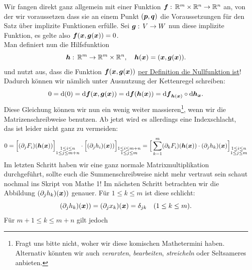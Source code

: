 Wir fangen direkt ganz allgemein mit einer Funktion ${{\text{\boldmath${f}$}}}:\,\mathbb{R}^m\times\mathbb{R}^n\rightarrow\mathbb{R}^n$ an, von der wir voraussetzen dass sie an einem Punkt $({{\text{\boldmath${p}$}}},{{\text{\boldmath${q}$}}})$ die Voraussetzungen für den Satz über implizite Funktionen erfülle. Sei ${{\text{\boldmath${g}$}}}:\,V\rightarrow W$ nun diese implizite Funktion, es gelte also ${{\text{\boldmath${f}$}}}({{\text{\boldmath${x}$}}},{{\text{\boldmath${g}$}}}({{\text{\boldmath${x}$}}}))=0$. \\
Man definiert nun die Hilfsfunktion
\begin{equation*}
    {{\text{\boldmath${h}$}}}:\,\mathbb{R}^m\rightarrow\mathbb{R}^m\times\mathbb{R}^n, \quad {{\text{\boldmath${h}$}}}({{\text{\boldmath${x}$}}})=({{\text{\boldmath${x}$}}},{{\text{\boldmath${g}$}}}({{\text{\boldmath${x}$}}})).
\end{equation*}
und nutzt aus, dass die Funktion ${{\text{\boldmath${f}$}}}({{\text{\boldmath${x}$}}},{{\text{\boldmath${g}$}}}({{\text{\boldmath${x}$}}}))$ \underline{per Definition die Nullfunktion ist}!\\
Dadurch können wir nämlich unter Ausnutzung der Kettenregel schreiben:
\begin{equation*}
    0=\text{d}(0)=\text{d}{{\text{\boldmath${f}$}}}({{\text{\boldmath${x}$}}},{{\text{\boldmath${g}$}}}({{\text{\boldmath${x}$}}}))=\text{d}{{\text{\boldmath${f}$}}}({{\text{\boldmath${h}$}}}({{\text{\boldmath${x}$}}}))=\text{d}{{\text{\boldmath${f}$}}}_{{{\text{\boldmath${h}$}}}({{\text{\boldmath${x}$}}})}\circ\text{d}{{\text{\boldmath${h}$}}}_{{\text{\boldmath${x}$}}}.
\end{equation*}
Diese Gleichung können wir nun ein wenig weiter massieren\footnote{Fragt uns bitte nicht, woher wir diese komischen Mathetermini haben. Alternativ könnten wir auch \textit{verarzten}, \textit{bearbeiten}, \textit{streicheln} oder Seltsameres anbieten.}, wenn wir die Matrizenschreibweise benutzen. Ab jetzt wird es allerdings eine Indexschlacht, das ist leider nicht ganz zu vermeiden:
\begin{equation*}
    0=\Big[ (\partial_j F_i)({{\text{\boldmath${h}$}}}({{\text{\boldmath${x}$}}})) \Big]_{\substack{1\leq i\leq n \\ 1 \leq j \leq m+n}}\cdot \Big[(\partial_j h_i)({{\text{\boldmath${x}$}}}))\Big]_{\substack{1 \leq i \leq m+n \\ 1 \leq j \leq m}} = \Big[ \sum_{k=1}^{m} (\partial_k F_i)({{\text{\boldmath${h}$}}}({{\text{\boldmath${x}$}}}))\cdot(\partial_j h_k)({{\text{\boldmath${x}$}}}) \Big]_{\substack{1\leq i\leq n \\ 1 \leq j \leq m}}
\end{equation*}
Im letzten Schritt haben wir eine ganz normale Matrixmultiplikation durchgeführt, sollte euch die Summenschreibweise nicht mehr vertraut sein schaut nochmal ins Skript von Mathe 1! Im nächsten Schritt betrachten wir die Abbildung $(\partial_j h_k)({{\text{\boldmath${x}$}}}))$ genauer. Für $1\leq k \leq m$ ist diese schlicht:
\begin{equation*}
    (\partial_j h_k)({{\text{\boldmath${x}$}}}))=(\partial_j x_k)({{\text{\boldmath${x}$}}})=\delta_{jk} \quad (1\leq k\leq m).
\end{equation*}
Für $m+1 \leq k \leq m+n$ gilt jedoch
